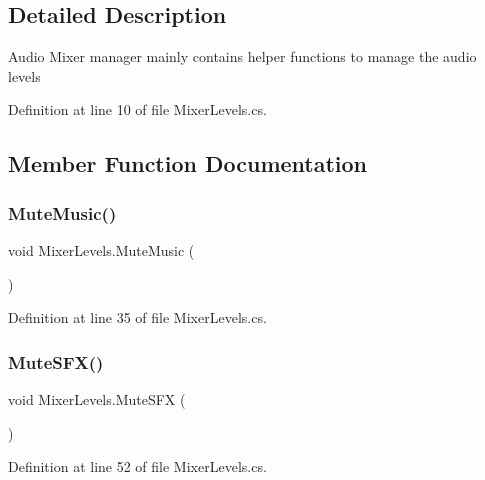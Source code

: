 \subsection{Detailed Description}
Audio Mixer manager mainly contains helper functions to manage the audio levels 



Definition at line 10 of file Mixer\+Levels.\+cs.



\subsection{Member Function Documentation}
\mbox{\label{class_mixer_levels_a115a44e41393771c433c4f47359f7d5b}} 
\subsubsection{\texorpdfstring{Mute\+Music()}{MuteMusic()}}
{\footnotesize\ttfamily void Mixer\+Levels.\+Mute\+Music (\begin{DoxyParamCaption}{ }\end{DoxyParamCaption})}



Definition at line 35 of file Mixer\+Levels.\+cs.

\mbox{\label{class_mixer_levels_a3b4fb0e5913dd3810c201eef23317972}} 
\subsubsection{\texorpdfstring{Mute\+S\+F\+X()}{MuteSFX()}}
{\footnotesize\ttfamily void Mixer\+Levels.\+Mute\+S\+FX (\begin{DoxyParamCaption}{ }\end{DoxyParamCaption})}



Definition at line 52 of file Mixer\+Levels.\+cs.

\mbox{\label{class_mixer_levels_ad23e6afca11d5277b1799b0681bdb0ec}} 

